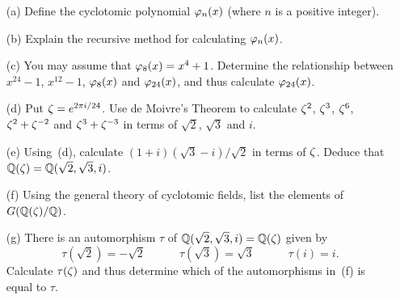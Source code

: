 \documentclass[a4paper]{article}
\begin{document}
\begin{problem}%
 \begin{itemize}
  \item[(a)] Define the cyclotomic polynomial $\varphi_n(x)$ (where $n$
   is a positive integer). 
  \item[(b)] Explain the recursive method for calculating $\varphi_n(x)$.  
  \item[(c)] You may assume that $\varphi_8(x)=x^4+1$.  Determine the
   relationship between $x^{24}-1$, $x^{12}-1$, $\varphi_8(x)$ and
   $\varphi_{24}(x)$, and thus calculate $\varphi_{24}(x)$. 
  \item[(d)] Put $\zeta=e^{2\pi i/24}$.  Use de Moivre's Theorem to
   calculate $\zeta^2$, $\zeta^3$, $\zeta^6$, $\zeta^2+\zeta^{-2}$ and
   $\zeta^3+\zeta^{-3}$ in terms of $\sqrt{2}$, $\sqrt{3}$ and $i$. 
  \item[(e)] Using~(d), calculate $(1+i)(\sqrt{3}-i)/\sqrt{2}$ in
   terms of $\zeta$.  Deduce that ${\mathbb{Q}}(\zeta)={\mathbb{Q}}(\sqrt{2},\sqrt{3},i)$.
  \item[(f)] Using the general theory of cyclotomic fields, list the
   elements of $G({\mathbb{Q}}(\zeta)/{\mathbb{Q}})$. 
  \item[(g)] There is an automorphism $\tau$ of
   ${\mathbb{Q}}(\sqrt{2},\sqrt{3},i)={\mathbb{Q}}(\zeta)$ given by 
   \[ \tau(\sqrt{2}) = -\sqrt{2} \hspace{3em}
      \tau(\sqrt{3}) = \sqrt{3} \hspace{3em}
      \tau(i) = i.
   \]
   Calculate $\tau(\zeta)$ and thus determine which of the automorphisms
   in~(f) is equal to $\tau$.  
 \end{itemize}
\end{problem}
\end{document}
